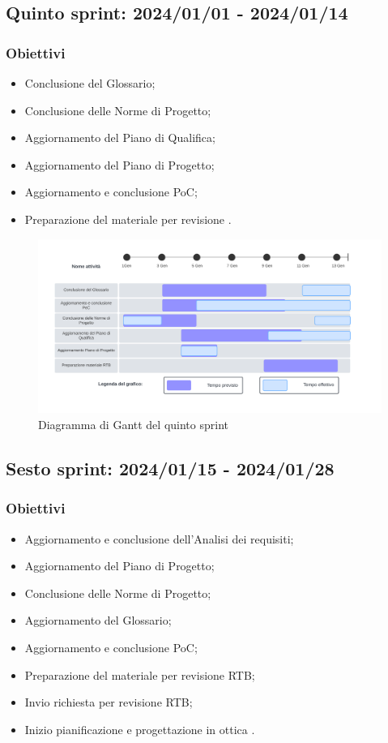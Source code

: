 \subsection{Quinto sprint: 2024/01/01 - 2024/01/14}
\subsubsection{Obiettivi}
\begin{itemize}
    \item Conclusione del Glossario;
    \item Conclusione delle Norme di Progetto;
    \item Aggiornamento del Piano di Qualifica;
    \item Aggiornamento del Piano di Progetto;
    \item Aggiornamento e conclusione PoC;
    \item Preparazione del materiale per revisione .
\end{itemize}

\begin{figure}[h!]
    \centering  
    \includegraphics[width=\textwidth]{Roadmap5sprint.png}
    \caption{Diagramma di Gantt del quinto sprint}
    \label{fig:roadmap5s}
\end{figure}
\newpage

\subsection{Sesto sprint: 2024/01/15 - 2024/01/28}
\subsubsection{Obiettivi}
\begin{itemize}
    \item Aggiornamento e conclusione dell'Analisi dei requisiti;
    \item Aggiornamento del Piano di Progetto;
    \item Conclusione delle Norme di Progetto;
    \item Aggiornamento del Glossario;
    \item Aggiornamento e conclusione PoC;
    \item Preparazione del materiale per revisione RTB;
    \item Invio richiesta per revisione RTB;
    \item Inizio pianificazione e progettazione in ottica .
\end{itemize}

